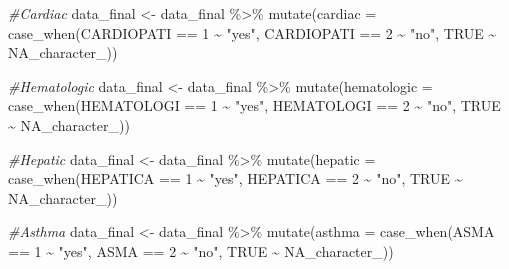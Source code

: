 \documentclass[
]{article}
\newenvironment{Shaded}{\begin{snugshade}}{\end{snugshade}}
\newcommand{\AttributeTok}[1]{\textcolor[rgb]{0.77,0.63,0.00}{#1}}
\newcommand{\CommentTok}[1]{\textcolor[rgb]{0.56,0.35,0.01}{\textit{#1}}}
\newcommand{\ConstantTok}[1]{\textcolor[rgb]{0.00,0.00,0.00}{#1}}
\newcommand{\DecValTok}[1]{\textcolor[rgb]{0.00,0.00,0.81}{#1}}
\newcommand{\FunctionTok}[1]{\textcolor[rgb]{0.00,0.00,0.00}{#1}}
\newcommand{\NormalTok}[1]{#1}
\newcommand{\OtherTok}[1]{\textcolor[rgb]{0.56,0.35,0.01}{#1}}
\newcommand{\SpecialCharTok}[1]{\textcolor[rgb]{0.00,0.00,0.00}{#1}}
\newcommand{\StringTok}[1]{\textcolor[rgb]{0.31,0.60,0.02}{#1}}
\begin{document}
\begin{Shaded}
\begin{Highlighting}[]
\CommentTok{\#Cardiac}
\NormalTok{data\_final }\OtherTok{\textless{}{-}}\NormalTok{  data\_final }\SpecialCharTok{\%\textgreater{}\%}
  \FunctionTok{mutate}\NormalTok{(}\AttributeTok{cardiac =} \FunctionTok{case\_when}\NormalTok{(CARDIOPATI }\SpecialCharTok{==} \DecValTok{1} \SpecialCharTok{\textasciitilde{}} \StringTok{"yes"}\NormalTok{,}
\NormalTok{                             CARDIOPATI }\SpecialCharTok{==} \DecValTok{2} \SpecialCharTok{\textasciitilde{}} \StringTok{"no"}\NormalTok{,}
                             \ConstantTok{TRUE} \SpecialCharTok{\textasciitilde{}} \ConstantTok{NA\_character\_}\NormalTok{))}

\CommentTok{\#Hematologic}
\NormalTok{data\_final }\OtherTok{\textless{}{-}}\NormalTok{  data\_final }\SpecialCharTok{\%\textgreater{}\%}
  \FunctionTok{mutate}\NormalTok{(}\AttributeTok{hematologic =} \FunctionTok{case\_when}\NormalTok{(HEMATOLOGI }\SpecialCharTok{==} \DecValTok{1} \SpecialCharTok{\textasciitilde{}} \StringTok{"yes"}\NormalTok{,}
\NormalTok{                                 HEMATOLOGI }\SpecialCharTok{==} \DecValTok{2} \SpecialCharTok{\textasciitilde{}} \StringTok{"no"}\NormalTok{,}
                                 \ConstantTok{TRUE} \SpecialCharTok{\textasciitilde{}} \ConstantTok{NA\_character\_}\NormalTok{))}

\CommentTok{\#Hepatic}
\NormalTok{data\_final }\OtherTok{\textless{}{-}}\NormalTok{  data\_final }\SpecialCharTok{\%\textgreater{}\%}
  \FunctionTok{mutate}\NormalTok{(}\AttributeTok{hepatic =} \FunctionTok{case\_when}\NormalTok{(HEPATICA }\SpecialCharTok{==} \DecValTok{1} \SpecialCharTok{\textasciitilde{}} \StringTok{"yes"}\NormalTok{,}
\NormalTok{                             HEPATICA }\SpecialCharTok{==} \DecValTok{2} \SpecialCharTok{\textasciitilde{}} \StringTok{"no"}\NormalTok{,}
                             \ConstantTok{TRUE} \SpecialCharTok{\textasciitilde{}} \ConstantTok{NA\_character\_}\NormalTok{))}

\CommentTok{\#Asthma}
\NormalTok{data\_final }\OtherTok{\textless{}{-}}\NormalTok{  data\_final }\SpecialCharTok{\%\textgreater{}\%}
  \FunctionTok{mutate}\NormalTok{(}\AttributeTok{asthma =} \FunctionTok{case\_when}\NormalTok{(ASMA }\SpecialCharTok{==} \DecValTok{1} \SpecialCharTok{\textasciitilde{}} \StringTok{"yes"}\NormalTok{,}
\NormalTok{                            ASMA }\SpecialCharTok{==} \DecValTok{2} \SpecialCharTok{\textasciitilde{}} \StringTok{"no"}\NormalTok{,}
                            \ConstantTok{TRUE} \SpecialCharTok{\textasciitilde{}} \ConstantTok{NA\_character\_}\NormalTok{))}


\end{Highlighting}
\end{Shaded}
\end{document}
